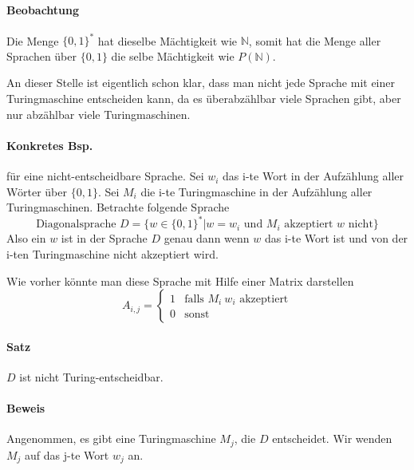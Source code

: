 \paragraph*{Beobachtung} Die Menge $\{0,1\}^*$ hat dieselbe Mächtigkeit wie $\mathbb{N}$, somit hat die Menge aller Sprachen über $\{0,1\}$ die selbe Mächtigkeit wie $P(\mathbb{N})$.

\para{} An dieser Stelle ist eigentlich schon klar, dass man nicht jede Sprache mit einer Turingmaschine entscheiden kann, da es überabzählbar viele Sprachen gibt, aber nur abzählbar viele Turingmaschinen.

\paragraph*{Konkretes Bsp.} für eine nicht-entscheidbare Sprache. Sei $w_i$ das i-te Wort in der Aufzählung aller Wörter über $\{0,1\}$. Sei $M_i$ die i-te Turingmaschine in der Aufzählung aller Turingmaschinen. Betrachte folgende Sprache $$ \text{Diagonalsprache } D=\{ w\in\{0,1\}^*|w=w_i \text{ und } M_i \text{ akzeptiert } w \text{ nicht} \} $$ Also ein $w$ ist in der Sprache $D$ genau dann wenn $w$ das i-te Wort ist und von der i-ten Turingmaschine nicht akzeptiert wird.

\para{} Wie vorher könnte man diese Sprache mit Hilfe einer Matrix darstellen %
$$ A_{i,j} = \begin{cases}1&\text{falls } M_i\ w_i \text{ akzeptiert} \\ 0 & \text{sonst}\end{cases} $$

\paragraph*{Satz} $D$ ist nicht Turing-entscheidbar.

\paragraph*{Beweis} Angenommen, es gibt eine Turingmaschine $M_j$, die $D$ entscheidet. Wir wenden $M_j$ auf das j-te Wort $w_j$ an.